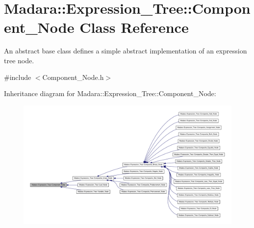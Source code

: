 \hypertarget{classMadara_1_1Expression__Tree_1_1Component__Node}{
\section{Madara::Expression\_\-Tree::Component\_\-Node Class Reference}
\label{de/da8/classMadara_1_1Expression__Tree_1_1Component__Node}
}


An abstract base class defines a simple abstract implementation of an expression tree node.  




{\ttfamily \#include $<$Component\_\-Node.h$>$}



Inheritance diagram for Madara::Expression\_\-Tree::Component\_\-Node:
\nopagebreak
\begin{figure}[H]
\begin{center}
\leavevmode
\includegraphics[width=400pt]{d7/ddb/classMadara_1_1Expression__Tree_1_1Component__Node__inherit__graph}
\end{center}
\end{figure}
